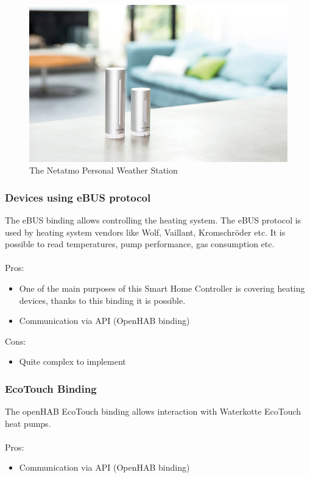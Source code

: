 \begin{figure}
	\centering
	\includegraphics[width=1\textwidth]{images/Chapter_05/netatmo-weather-station.jpg}
	\caption{The Netatmo Personal Weather Station}
	\label{fig:netatmo-weather-station}
\end{figure}

\subsubsection{Devices using eBUS protocol}
The eBUS binding allows controlling the heating system. The eBUS protocol is used by heating system vendors like Wolf, Vaillant,
Kromschröder etc. It is possible to read temperatures, pump performance, gas consumption etc.\\~\\
Pros:
\begin{itemize}
	\item One of the main purposes of this Smart Home Controller is covering heating devices, thanks to this binding it is possible.
	\item Communication via API (OpenHAB binding)
\end{itemize}
Cons:
\begin{itemize}
	\item Quite complex to implement
\end{itemize}

\subsubsection{EcoTouch Binding}
The openHAB EcoTouch binding allows interaction with Waterkotte EcoTouch heat pumps.\\~\\
Pros:
\begin{itemize}
	\item Communication via API (OpenHAB binding)
\end{itemize}

